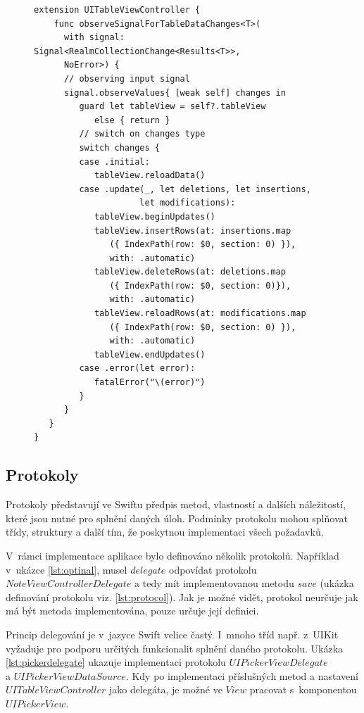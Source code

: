 \documentclass[thesis=M,czech]{FITthesis}[2012/06/26]
\begin{document}
\begin{figure}
\begin{minipage}{\linewidth}
\begin{lstlisting}[caption={Ukázka Extension},label={lst:extension}]
extension UITableViewController {
    func observeSignalForTableDataChanges<T>(
      with signal: Signal<RealmCollectionChange<Results<T>>,
      NoError>) {
      // observing input signal
      signal.observeValues{ [weak self] changes in
         guard let tableView = self?.tableView
            else { return }
         // switch on changes type   
         switch changes {
         case .initial:
            tableView.reloadData()
         case .update(_, let deletions, let insertions,
                     let modifications):
            tableView.beginUpdates()
            tableView.insertRows(at: insertions.map
               ({ IndexPath(row: $0, section: 0) }),
               with: .automatic)
            tableView.deleteRows(at: deletions.map
               ({ IndexPath(row: $0, section: 0)}),
               with: .automatic)
            tableView.reloadRows(at: modifications.map
               ({ IndexPath(row: $0, section: 0) }),
               with: .automatic)
            tableView.endUpdates()
         case .error(let error):
            fatalError("\(error)")
         }
      }
   }
}
\end{lstlisting}
\end{minipage}
\end{figure}
	
\subsection{Protokoly}
Protokoly představují ve Swiftu předpis metod, vlastností a dalších náležitostí, které jsou nutné pro splnění daných úloh. Podmínky protokolu mohou splňovat třídy, struktury a další tím, že poskytnou implementaci všech požadavků. \cite{devProtocol}

V~rámci implementace aplikace bylo definováno několik protokolů. Například v~ukázce \ref{lst:optinal}, musel $delegate$ odpovídat protokolu\\ $NoteViewControllerDelegate$ a tedy mít implementovanou metodu $save$ (ukázka definování protokolu viz. \ref{lst:protocol}). Jak je možné vidět, protokol neurčuje jak má být metoda implementována, pouze určuje její definici.

Princip delegování je v~jazyce Swift velice častý. I~mnoho tříd např. z~UIKit vyžaduje pro podporu určitých funkcionalit splnění daného protokolu. Ukázka \ref{lst:pickerdelegate} ukazuje implementaci protokolu $UIPickerViewDelegate$\\ a $UIPickerViewDataSource$. Kdy po implementaci příslušných metod a nastavení $UITableViewController$ jako delegáta, je možné ve $View$ pracovat s~komponentou $UIPickerView$.
	
\end{document}
